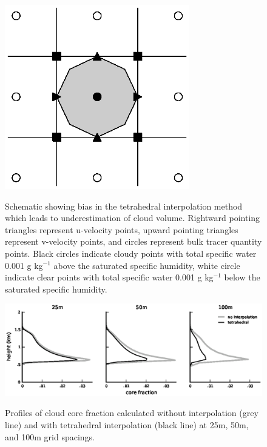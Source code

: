 \documentclass[12pt]{article}
\begin{document}
\begin{figure}[t]
  \noindent\includegraphics[width=19pc,angle=0]{./figures/interpolation_bias}\\ 
  \caption{Schematic showing bias in the tetrahedral interpolation method 
  which leads to underestimation of cloud volume.  Rightward pointing 
  triangles represent u-velocity points, upward pointing triangles represent 
  v-velocity points, and circles represent bulk tracer quantity points.
  Black circles indicate cloudy points with total specific water 0.001 g 
  kg$^{-1}$ above the saturated specific humidity, white circle indicate 
  clear points with total specific water 0.001 g kg$^{-1}$ below the 
  saturated specific humidity.
  }\label{fig:interpolation_bias}
\end{figure}

\begin{figure}[t]
  \noindent\includegraphics[width=40pc,angle=0]{./figures/area_comparison}\\ 
  \caption{Profiles of cloud core fraction calculated without interpolation 
  (grey line) and with tetrahedral interpolation (black line) at 25m, 50m, 
  and 100m grid spacings.
  }\label{fig:area_comparison}
\end{figure}
\end{document}

